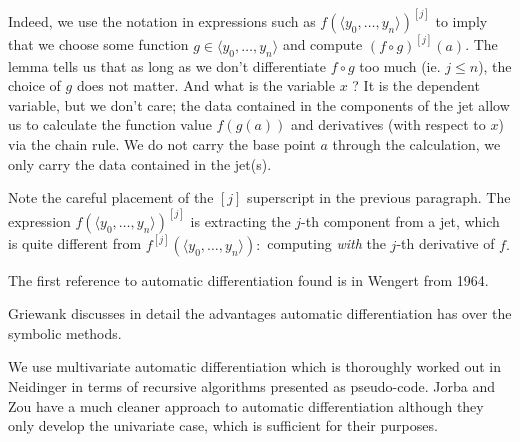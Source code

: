 \documentclass[11pt]{article}
\begin{document}
Indeed, we use the notation in expressions such as $f(\langle y_0, \dots, y_n\rangle)^{[j]}$
to imply that we choose some function $g\in\langle y_0, \dots, y_n\rangle$ 
and compute $(f\circ g)^{[j]}(a)$. The lemma tells
us that as long as we don't differentiate $f\circ g$ too much (ie. $j\le n$),
the choice of $g$ does not matter.
And what is the variable $x$ ?
It is the dependent variable, but we don't care;
the data contained in the components of
the jet allow us to calculate the function value $f(g(a))$ and
derivatives (with respect to $x$) via the chain rule.
We do not carry the base point $a$ through the calculation, we
only carry the data contained in the jet(s).

Note the careful placement of the $[j]$ superscript in the
previous paragraph.
The expression $f(\langle y_0, \dots, y_n\rangle)^{[j]}$
is extracting the $j$-th component from a jet,
which is quite different from 
 $f^{[j]}(\langle y_0, \dots, y_n\rangle):$
computing {\em with} the $j$-th derivative of $f.$





%
%

The first reference to automatic differentiation found is in Wengert \cite{Wengert1964} from 1964.

Griewank \cite{Griewank1989} discusses in detail
the advantages automatic differentiation has over the symbolic methods.

We use multivariate automatic differentiation which is 
thoroughly worked out in Neidinger \cite{Neidinger1992}
in terms of recursive algorithms presented as pseudo-code.
Jorba and Zou \cite{JorbaZou2005} have a much cleaner approach
to automatic differentiation
although they only develop the univariate case, which is sufficient
for their purposes.
\end{document}
